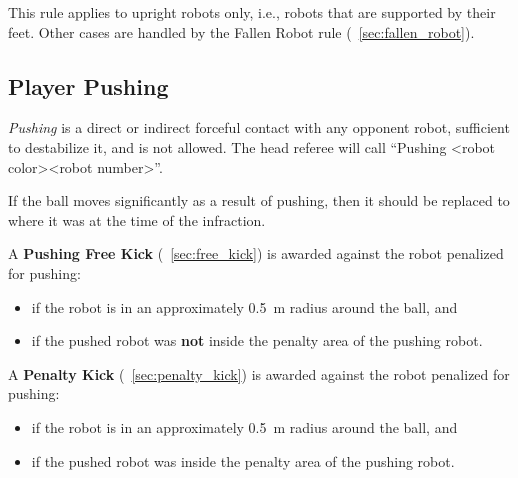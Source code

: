This rule applies to upright robots only, i.e., robots that are supported by their feet. Other cases are handled by the Fallen Robot rule (\cf~\cref{sec:fallen_robot}).

\subsection{Player Pushing}
\label{sec:player_pushing}

\emph{Pushing} is a direct or indirect forceful contact with any opponent robot, sufficient to destabilize it, and is not allowed. The head referee will call ``Pushing \textless robot color\textgreater \textless robot number\textgreater''.

If the ball moves significantly as a result of pushing, then it should be replaced to where it was at the time of the infraction.

A \textbf{Pushing Free Kick} (\cf~\cref{sec:free_kick}) is awarded against the robot penalized for pushing:
\begin{itemize}
  \item if the robot is in an approximately \qty{0.5}{\metre} radius around the ball, and
  \item if the pushed robot was \textbf{not} inside the penalty area of the pushing robot.
\end{itemize}

A \textbf{Penalty Kick} (\cf~\cref{sec:penalty_kick}) is awarded against the robot penalized for pushing:
\begin{itemize}
  \item if the robot is in an approximately \qty{0.5}{\metre} radius around the ball, and
  \item if the pushed robot was inside the penalty area of the pushing robot.
\end{itemize}

